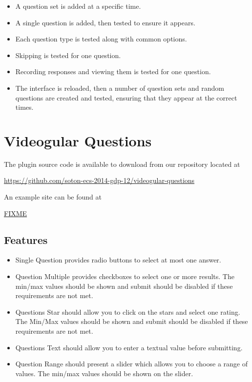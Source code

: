 \documentclass[12pt,a4paper]{article}
\begin{document}
\begin{itemize}
\item A question set is added at a specific time.
\item A single question is added, then tested to ensure it appears.
\item Each question type is tested along with common options.
\item Skipping is tested for one question.
\item Recording responses and viewing them is tested for one question.
\item The interface is reloaded, then a number of question sets and random questions are created and tested, ensuring that they appear at the correct times.
\end{itemize}

\section{Videogular Questions}

The plugin source code is available to download from our repository located at

\url{https://github.com/soton-ecs-2014-gdp-12/videogular-questions}

An example site can be found at

\url{FIXME}

\subsection{Features}

\begin{itemize}
\item Single Question provides radio buttons to select at most one answer.
\item Question Multiple provides checkboxes to select one or more results. The min/max values should be shown and submit should be disabled if these requirements are not met.
\item Questions Star should allow you to click on the stars and select one rating. The Min/Max values should be shown and submit should be disabled if these requirements are not met.
\item Questions Text should allow you to enter a textual value before submitting.
\item Question Range should present a slider which allows you to choose a range of values. The min/max values should be shown on the slider.
\end{itemize}
\end{document}
